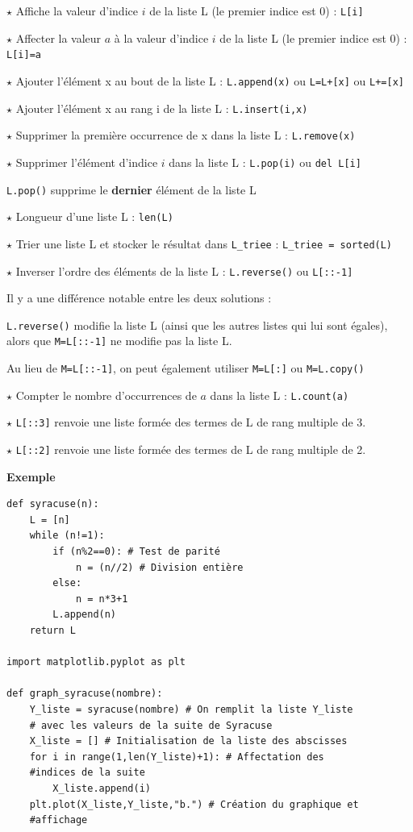 $\star$ Affiche la valeur d'indice $i$ de la liste L (le premier indice est 0) :
\verb!L[i]!

$\star$ Affecter la valeur $a$ à la valeur d'indice $i$ de la liste L (le premier indice est 0) :
\verb!L[i]=a!

$\star$ Ajouter l'élément x au bout de la liste L :
\verb!L.append(x)! ou \verb~L=L+[x]~ ou \verb~L+=[x]~

$\star$ Ajouter l'élément x au rang i de la liste L :
\verb!L.insert(i,x)!

$\star$ Supprimer la première occurrence de x dans la
liste L : \verb!L.remove(x)!

$\star$ Supprimer l'élément d'indice $i$ dans la liste L :
\verb!L.pop(i)! ou \verb!del L[i]!

\verb~L.pop()~ supprime le \textbf{dernier} élément de la liste L

$\star$ Longueur d'une liste L :
\verb!len(L)!

$\star$ Trier une liste L et stocker le résultat dans
\verb!L_triee! :
\verb!L_triee = sorted(L)!

$\star$ Inverser l'ordre des éléments de la liste L :
\verb!L.reverse()! ou  \verb~L[::-1]~

\danger Il y a une différence notable entre les deux solutions :

\verb!L.reverse()! modifie la liste L (ainsi que les autres listes qui lui sont égales), alors que
\verb~M=L[::-1]~ ne modifie pas la liste L.

Au lieu de \verb!M=L[::-1]!, on peut également utiliser 
\verb!M=L[:]! ou \verb!M=L.copy()!

$\star$ Compter le nombre d'occurrences de $a$ dans la liste L :
\verb!L.count(a)!

$\star$ \verb!L[::3]! renvoie une liste formée des termes de L de rang multiple de 3.

$\star$ \verb!L[::2]! renvoie une liste formée des termes de L de rang multiple de 2.

\medskip

\textbf{\large Exemple}

\begin{lstlisting}
def syracuse(n):
    L = [n]
    while (n!=1):
        if (n%2==0): # Test de parité
            n = (n//2) # Division entière
        else:
            n = n*3+1
        L.append(n)
    return L

import matplotlib.pyplot as plt

def graph_syracuse(nombre):
    Y_liste = syracuse(nombre) # On remplit la liste Y_liste
    # avec les valeurs de la suite de Syracuse
    X_liste = [] # Initialisation de la liste des abscisses
    for i in range(1,len(Y_liste)+1): # Affectation des 
    #indices de la suite
        X_liste.append(i)
    plt.plot(X_liste,Y_liste,"b.") # Création du graphique et 
    #affichage
\end{lstlisting}

